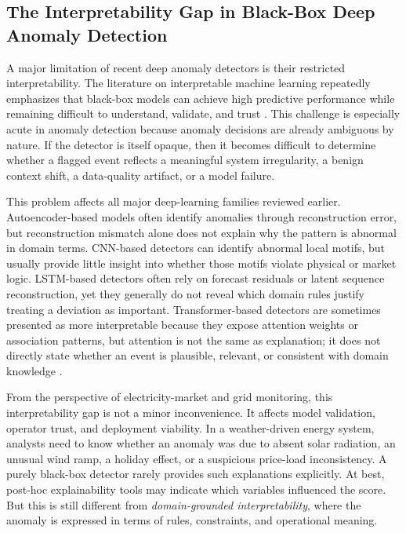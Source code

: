 \subsection{The Interpretability Gap in Black-Box Deep Anomaly Detection}

A major limitation of recent deep anomaly detectors is their restricted interpretability. The literature on interpretable machine learning repeatedly emphasizes that black-box models can achieve high predictive performance while remaining difficult to understand, validate, and trust \cite{doshi2017rigorous,lipton2018mythos,guidotti2018survey,arrieta2020xai,rudin2019stop}. This challenge is especially acute in anomaly detection because anomaly decisions are already ambiguous by nature. If the detector is itself opaque, then it becomes difficult to determine whether a flagged event reflects a meaningful system irregularity, a benign context shift, a data-quality artifact, or a model failure.

This problem affects all major deep-learning families reviewed earlier. Autoencoder-based models often identify anomalies through reconstruction error, but reconstruction mismatch alone does not explain why the pattern is abnormal in domain terms. CNN-based detectors can identify abnormal local motifs, but usually provide little insight into whether those motifs violate physical or market logic. LSTM-based detectors often rely on forecast residuals or latent sequence reconstruction, yet they generally do not reveal which domain rules justify treating a deviation as important. Transformer-based detectors are sometimes presented as more interpretable because they expose attention weights or association patterns, but attention is not the same as explanation; it does not directly state whether an event is plausible, relevant, or consistent with domain knowledge \cite{lipton2018mythos,arrieta2020xai}.

From the perspective of electricity-market and grid monitoring, this interpretability gap is not a minor inconvenience. It affects model validation, operator trust, and deployment viability. In a weather-driven energy system, analysts need to know whether an anomaly was due to absent solar radiation, an unusual wind ramp, a holiday effect, or a suspicious price-load inconsistency. A purely black-box detector rarely provides such explanations explicitly. At best, post-hoc explainability tools may indicate which variables influenced the score. But this is still different from \emph{domain-grounded interpretability}, where the anomaly is expressed in terms of rules, constraints, and operational meaning.

